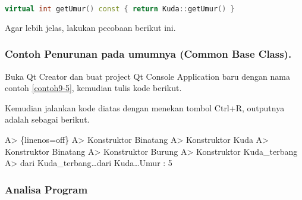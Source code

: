 \begin{lstlisting}[language=c++, numbers=none]
virtual int getUmur() const { return Kuda::getUmur() }
\end{lstlisting}

Agar lebih jelas, lakukan pecobaan berikut ini.

\subsubsection*{Contoh  Penurunan pada umumnya (Common Base Class).}

Buka Qt Creator dan buat project Qt Console Application baru dengan nama
contoh \ref{contoh9-5}, kemudian tulis kode berikut.





Kemudian jalankan kode diatas dengan menekan tombol Ctrl+R, outputnya
adalah sebagai berikut.

A\textgreater{} \{linenos=off\} A\textgreater{} Konstruktor Binatang
A\textgreater{} Konstruktor Kuda A\textgreater{} Konstruktor Binatang
A\textgreater{} Konstruktor Burung A\textgreater{} Konstruktor
Kuda\_terbang A\textgreater{} dari Kuda\_terbang\ldots{}dari
Kuda\ldots{}Umur : 5

\subsubsection*{Analisa Program}

